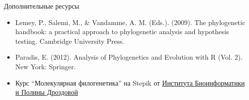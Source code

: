 \documentclass[
  ignorenonframetext,
  russian,
]{beamer}
\begin{document}
\begin{frame}{Дополнительные ресурсы}
\protect{}\label{ux434ux43eux43fux43eux43bux43dux438ux442ux435ux43bux44cux43dux44bux435-ux440ux435ux441ux443ux440ux441ux44b}
\begin{itemize}
\item
  Lemey, P., Salemi, M., \& Vandamme, A. M. (Eds.). (2009). The
  phylogenetic handbook: a practical approach to phylogenetic analysis
  and hypothesis testing. Cambridge University Press.
\item
  Paradis, E. (2012). Analysis of Phylogenetics and Evolution with R
  (Vol. 2). New York: Springer.
\item
  Курс ``Молекулярная филогенетика'' на Stepik от
  \href{https://stepik.org/course/2054/syllabus}{Института
  Биоинформатики и Полины Дроздовой}
\end{itemize}
\end{frame}
\end{document}
